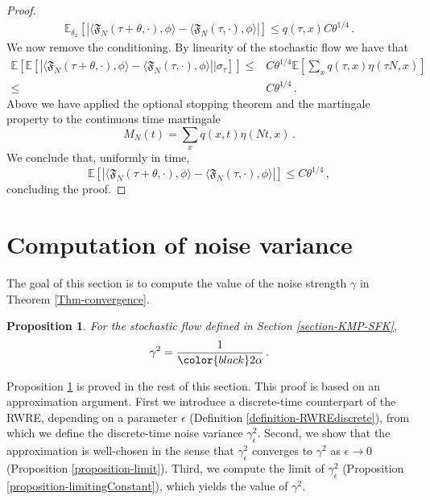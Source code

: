 \documentclass[a4paper,11pt,oneside,reqno]{amsart}
\newtheorem{proposition}[theorem]{Proposition}
\theoremstyle{definition}
\renewcommand{\leq}{\leqslant}
\numberwithin{equation}{section}
\begin{document}
\begin{proof}
{\begin{equation*}
\begin{split}
		\mathbb{E}_{\delta_{x}}\left[|\langle \mathfrak{F}_{N}(\tau+\theta,\cdot),\phi\rangle-\langle \mathfrak{F}_{N}(\tau,\cdot),\phi\rangle|\right]
		\leq q(\tau,x)C\theta^{1/4}\,.
	\end{split}
\end{equation*}
We now remove the conditioning. By linearity of the stochastic flow we have that
\begin{equation*}
	\begin{split}
		\mathbb{E}\left[\mathbb{E}\left[|\langle \mathfrak{F}_{N}(\tau+\theta,\cdot),\phi\rangle-\langle \mathfrak{F}_{N}(\tau,\cdot),\phi\rangle|\bigg|\sigma_{\tau}\right]\right]\leq& C\theta^{1/4}\mathbb{E}\left[\sum_{x}q(\tau,x)\eta(\tau N,x)\right]
		\\\leq& C\theta^{1/4}\,.
	\end{split}
\end{equation*}
Above we have applied the optional stopping theorem and the martingale property to the continuous time martingale
\begin{equation*}
	M_{N}(t)=\sum_{x}q(x,t)\eta(Nt,x)\,.
\end{equation*}
We conclude that, uniformly in time, 
\begin{equation*}
	\mathbb{E}\left[|\langle \mathfrak{F}_{N}(\tau+\theta,\cdot),\phi\rangle-\langle \mathfrak{F}_{N}(\tau,\cdot),\phi\rangle|\right]\leq C\theta^{1/4}\,,
\end{equation*} 
concluding the proof.}
\end{proof}
\section{Computation of noise variance}\label{Section-noiceVariance}
The goal of this section is to compute the value of the noise strength  $\gamma$ in Theorem \ref{Thm-convergence}. 
	\begin{proposition}\label{proposition-exact-constant}
For the stochastic flow defined in Section \ref{section-KMP-SFK}, 
	\begin{equation*}
		\gamma^{2}=\frac{1}{{\color{black}2}\alpha}\,.
	\end{equation*}
\end{proposition}
Proposition \ref{proposition-exact-constant} is proved in the rest of this section. This proof is based on an approximation argument. First we introduce a discrete-time counterpart of the RWRE, depending on a parameter $\epsilon$ (Definition \ref{definition-RWREdiscrete}), from which we define the discrete-time noise variance $\gamma_{\epsilon}^{2}$. Second, we show that the approximation is well-chosen in the sense that $\gamma_{\epsilon}^{2}$ converges to $\gamma^{2}$ as $\epsilon\to 0$ (Proposition \ref{proposition-limit}). Third, we compute the limit of $\gamma_{\epsilon}^{2}$ (Proposition \ref{proposition-limitingConstant}), which yields  the value of $\gamma^2$. 
\end{document}
